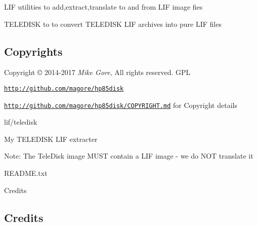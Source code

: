 
\begin{DoxyItemize}
\item L\+IF utilities to add,extract,translate to and from L\+IF image fies
\item T\+E\+L\+E\+D\+I\+SK to to convert T\+E\+L\+E\+D\+I\+SK L\+IF archives into pure L\+IF files 

 \subsection*{Copyrights}
\end{DoxyItemize}


\begin{DoxyItemize}
\item Copyright \copyright{} 2014-\/2017 {\itshape Mike Gore}, All rights reserved. G\+PL
\begin{DoxyItemize}
\item \href{http://github.com/magore/hp85disk}{\tt http\+://github.\+com/magore/hp85disk}
\item \href{http://github.com/magore/hp85disk/COPYRIGHT.md}{\tt http\+://github.\+com/magore/hp85disk/\+C\+O\+P\+Y\+R\+I\+G\+H\+T.\+md} for Copyright details
\item lif/teledisk
\begin{DoxyItemize}
\item My T\+E\+L\+E\+D\+I\+SK L\+IF extracter
\begin{DoxyItemize}
\item Note\+: The Tele\+Disk image M\+U\+ST contain a L\+IF image -\/ we do N\+OT translate it
\end{DoxyItemize}
\item R\+E\+A\+D\+M\+E.\+txt
\begin{DoxyItemize}
\item Credits
\end{DoxyItemize}
\end{DoxyItemize}
\end{DoxyItemize}
\end{DoxyItemize}



 \subsection*{Credits}


